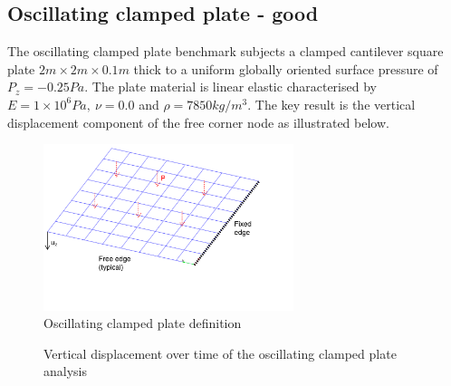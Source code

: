 \subsection{Oscillating clamped plate - good}

The oscillating clamped plate benchmark subjects a clamped cantilever square plate $2m\times2m\times0.1m$ thick to a uniform globally oriented surface pressure of $P_z = -0.25 Pa$. The plate material is linear elastic characterised by $E = 1\times 10^6 Pa,\ \nu = 0.0$ and $\rho = 7850 kg/m^3$. The key result is the vertical displacement component of the free corner node as illustrated below.

\begin{figure}[H]
	\centering
	\def\svgwidth{\columnwidth}
	\includegraphics[width=7.3cm]{images/quad_bend_problem.png}
	\caption{Oscillating clamped plate definition}
\end{figure}
\begin{figure}[H]
	\caption{\label{ref_label_overall}Vertical displacement over time of the oscillating clamped plate analysis}
\end{figure}


